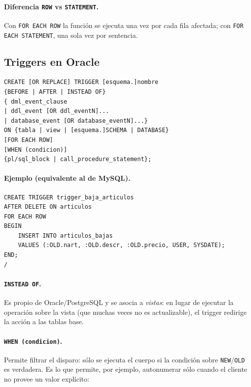 \documentclass[11pt,a4paper]{article}
\begin{document}
\paragraph{Diferencia \texttt{ROW} vs \texttt{STATEMENT}.} Con
\texttt{FOR EACH ROW} la función se ejecuta una vez por cada fila
afectada; con \texttt{FOR EACH STATEMENT}, una sola vez por sentencia.

\subsection{Triggers en Oracle}

\begin{lstlisting}
CREATE [OR REPLACE] TRIGGER [esquema.]nombre
{BEFORE | AFTER | INSTEAD OF}
{ dml_event_clause
| ddl_event [OR ddl_eventN]...
| database_event [OR database_eventN]...}
ON {tabla | view | [esquema.]SCHEMA | DATABASE}
[FOR EACH ROW]
[WHEN (condicion)]
{pl/sql_block | call_procedure_statement};
\end{lstlisting}

\paragraph{Ejemplo (equivalente al de MySQL).}

\begin{lstlisting}
CREATE TRIGGER trigger_baja_articulos
AFTER DELETE ON articulos
FOR EACH ROW
BEGIN
    INSERT INTO articulos_bajas
    VALUES (:OLD.nart, :OLD.descr, :OLD.precio, USER, SYSDATE);
END;
/
\end{lstlisting}

\paragraph{\texttt{INSTEAD OF}.} Es propio de Oracle/PostgreSQL y se
asocia a \emph{vistas}: en lugar de ejecutar la operación sobre la
vista (que muchas veces no es actualizable), el trigger redirige la
acción a las tablas base.

\paragraph{\texttt{WHEN (condicion)}.} Permite filtrar el disparo:
sólo se ejecuta el cuerpo si la condición sobre \texttt{NEW}/\texttt{OLD}
es verdadera. Es lo que permite, por ejemplo, autonumerar sólo cuando
el cliente no provee un valor explícito:
\end{document}
